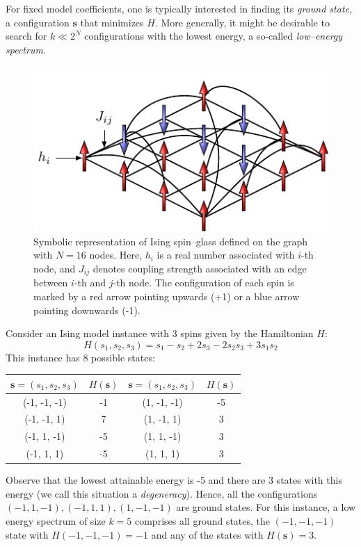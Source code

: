 For fixed model coefficients, one is typically interested in finding its \emph{ground state}, a
configuration $\mathbf{s}$ that minimizes $H$. More generally, it might be desirable to search for
$k \ll 2^N$ configurations with the lowest energy, a so-called \emph{low--energy spectrum}.

\begin{figure}[H]
    \centering
    \includegraphics{figures/spins.pdf}
    \caption{Symbolic representation of Ising spin--glass defined on the graph with $N=16$ nodes. Here, $h_i$ is a real number associated with $i$-th node, and $J_{ij}$ denotes coupling strength associated with an edge between $i$-th and $j$-th node. The configuration of each spin is marked by a red arrow pointing upwards (+1) or a blue arrow pointing downwards (-1).}
    \label{fig:my_label}
\end{figure}

\begin{example}
Consider an Ising model instance with 3 spins given by the Hamiltonian $H$:
\begin{equation}
H(s_1, s_2, s_3) = s_1 - s_2 +2s_3 - 2s_2s_3 + 3s_1s_2
\end{equation}
This instance has 8 possible states:

\begin{table}[h]
    \begin{center}
        \begin{tabular}{|c|c||c|c|}
        \hline
        $\mathbf{s}=(s_1, s_2, s_3)$ &
        $H(\mathbf{s})$ &
        $\mathbf{s}=(s_1, s_2, s_3)$ &
        $H(\mathbf{s})$\\\hline
        (-1, -1, -1) & -1 & (1, -1, -1) & -5\\ \hline
        (-1, -1, 1) & 7 & (1, -1, 1) & 3 \\ \hline
        (-1, 1, -1) & -5 & (1, 1, -1) & 3 \\ \hline
        (-1, 1, 1) & -5 & (1, 1, 1) & 3\\ \hline
        \end{tabular}
    \end{center}
\end{table}
Observe that the lowest attainable energy is -5 and there are 3 states with this energy (we call
this situation a \emph{degeneracy}). Hence, all the configurations $(-1, 1, -1), (-1, 1, 1), (1,
-1, -1)$ are ground states. For this instance, a low energy spectrum of size $k=5$ comprises all
ground states, the $(-1, -1, -1)$ state with $H(-1, -1, -1) = -1$ and any of the states with
$H(\mathbf{s})=3$.
\end{example}

